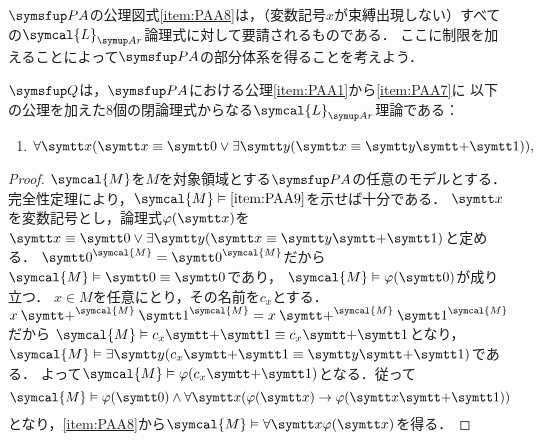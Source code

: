 \(\PA\)の公理図式\cref{item:PAA8}は，（変数記号\(x\)が束縛出現しない）すべての\(\symcal{L}_{\Ar}\)論理式に対して要請されるものである．
ここに制限を加えることによって\(\PA\)の部分体系を得ることを考えよう．

\begin{Def} \label{Def:robinsonarithmetic}
	\(\Robinson\)は，\(\PA\)における公理\cref{item:PAA1}から\cref{item:PAA7}に
	以下の公理を加えた8個の閉論理式からなる\(\symcal{L}_{\Ar}\)理論である：
	\begin{enumerate}[label=A\arabic*.,ref=A\arabic*,start=9]
		\item \label{item:PAA9} \(\forall \obj{x} \paren{\obj{x} \objeq \obj{0} \lor \exists \obj{y} \paren{\obj{x} \objeq \obj{y} \obj{+} \obj{1}}},\)
	\end{enumerate}
\end{Def}


\begin{proof}
	\(\symcal{M}\)を\(M\)を対象領域とする\(\PA\)の任意のモデルとする．
	完全性定理により，\(\symcal{M} \satisfy \text{\cref{item:PAA9}}\)を示せば十分である．
	\(\obj{x}\)を変数記号とし，論理式\(\apply{\varphi}{\obj{x}}\)を\(\obj{x} \objeq \obj{0} \lor \exists \obj{y} \paren{\obj{x} \objeq \obj{y} \obj{+} \obj{1}}\)と定める．
	\(\interpretation{\symcal{M}}{\obj{0}} = \interpretation{\symcal{M}}{\obj{0}}\)だから
	\(\symcal{M} \satisfy \obj{0} \objeq \obj{0}\)であり，
	\(\symcal{M} \satisfy \apply{\varphi}{\obj{0}}\)が成り立つ．
	\(x \in M\)を任意にとり，その名前を\(c_x\)とする．
	\(x \mathbin{\interpretation{\symcal{M}}{\obj{+}}} \interpretation{\symcal{M}}{\obj{1}} = x \mathbin{\interpretation{\symcal{M}}{\obj{+}}} \interpretation{\symcal{M}}{\obj{1}}\)だから
	\(\symcal{M} \satisfy c_x \obj{+} \obj{1} \objeq c_x \obj{+} \obj{1}\)となり，
	\(\symcal{M} \satisfy \exists \obj{y} \paren{c_x \obj{+} \obj{1} \objeq \obj{y} \obj{+} \obj{1}}\)である．
	よって\(\symcal{M} \satisfy \apply{\varphi}{c_x \obj{+} \obj{1}}\)となる．従って
	\[
		\symcal{M} \satisfy \apply{\varphi}{\obj{0}} \land \forall \obj{x} \paren{\apply{\varphi}{\obj{x}} \to \apply{\varphi}{\obj{x} \obj{+} \obj{1}}}
	\]
	となり，\cref{item:PAA8}から\(\symcal{M} \satisfy \forall \obj{x} \apply{\varphi}{\obj{x}}\)を得る．
\end{proof}

